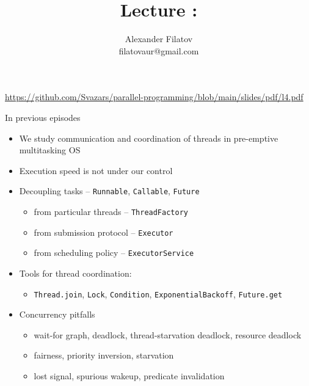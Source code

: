 


\title[]{Lecture \syncPrimitivesNum: \syncPrimitivesTopic}
\subtitle[]{\syncPrimitivesKey}
\author[]{Alexander Filatov\\ filatovaur@gmail.com}

\date{}



\begin{frame}
  \titlepage
  \url{https://github.com/Svazars/parallel-programming/blob/main/slides/pdf/l4.pdf}
\end{frame}

\begin{frame}{In previous episodes}

\begin{itemize}
    \item We study communication and coordination of threads in pre-emptive multitasking OS
    \item Execution speed is not under our control
    \item Decoupling tasks -- \texttt{Runnable}, \texttt{Callable}, \texttt{Future}
        \begin{itemize}
            \item from particular threads  -- \texttt{ThreadFactory}
            \item from submission protocol -- \texttt{Executor}
            \item from scheduling policy   -- \texttt{ExecutorService}
        \end{itemize}        
    \item Tools for thread coordination:
        \begin{itemize}
            \item \texttt{Thread.join}, \texttt{Lock}, \texttt{Condition}, \texttt{ExponentialBackoff}, \texttt{Future.get}
        \end{itemize}
    \item Concurrency pitfalls
        \begin{itemize}
            \item wait-for graph, deadlock, thread-starvation deadlock, resource deadlock
            \item fairness, priority inversion, starvation
            \item lost signal, spurious wakeup, predicate invalidation
        \end{itemize}    
\end{itemize}
\end{frame}

